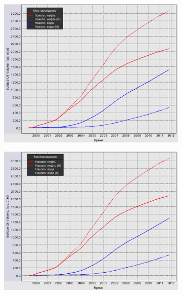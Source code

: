 \documentclass[a4paper,12pt]{article}
\begin{document}
\begin{figure}[H]
	\begin{subfigure}[t]{\dimexpr.5\linewidth-1.3em\relax}
		\centering
		\includegraphics[width=.95\linewidth]{nakop_default_model}
	\end{subfigure}
\hfill %
	\begin{subfigure}[t]{\dimexpr.5\linewidth-1.3em\relax}
		\centering
		\includegraphics[width=.95\linewidth]{nakop_anizotropy_model}
	\end{subfigure}
\\[20pt]

\end{figure}
\end{document}
